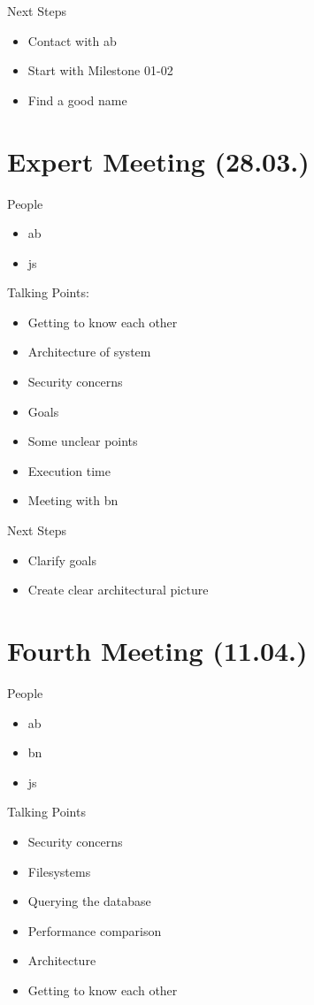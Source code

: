 Next Steps
\begin{itemize}
    \item Contact with \gls{ab}
    \item Start with Milestone 01-02
    \item Find a good name
\end{itemize}

\section{Expert Meeting (28.03.)}
\label{sec:meetingexpert}

People
\begin{itemize}
    \item \gls{ab}
    \item \gls{js}
\end{itemize}

Talking Points:
\begin{itemize}
    \item Getting to know each other
    \item Architecture of system
    \item Security concerns
    \item Goals
    \item Some unclear points
    \item Execution time
    \item Meeting with \gls{bn}
\end{itemize}

Next Steps
\begin{itemize}
    \item Clarify goals
    \item Create clear architectural picture
\end{itemize}

\section{Fourth Meeting (11.04.)}
\label{sec:meeting04}

People
\begin{itemize}
    \item \gls{ab}
    \item \gls{bn}
    \item \gls{js}
\end{itemize}

Talking Points
\begin{itemize}
    \item Security concerns
    \item Filesystems
    \item Querying the database
    \item Performance comparison
    \item Architecture
    \item Getting to know each other
\end{itemize}

